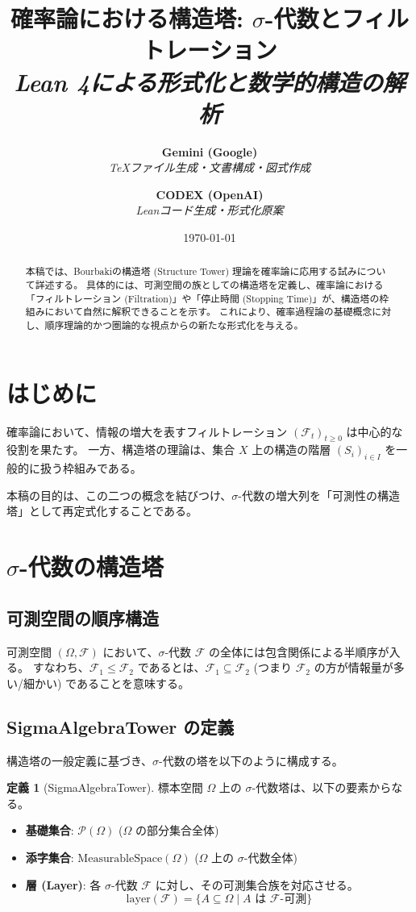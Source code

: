 \documentclass[a4paper,11pt]{article}
\title{確率論における構造塔: $\sigma$-代数とフィルトレーション\\
\large \textit{Lean 4による形式化と数学的構造の解析}}
\author{
  \textbf{Gemini (Google)} \\
  \small \textit{TeXファイル生成・文書構成・図式作成}
  \and
  \textbf{CODEX (OpenAI)} \\
  \small \textit{Leanコード生成・形式化原案}
}
\date{\today}
\theoremstyle{definition}
\newtheorem{definition}{定義}[section]
\theoremstyle{plain}
\begin{document}
\maketitle

\begin{abstract}
本稿では、Bourbakiの構造塔 (Structure Tower) 理論を確率論に応用する試みについて詳述する。
具体的には、可測空間の族としての構造塔を定義し、確率論における「フィルトレーション (Filtration)」や「停止時間 (Stopping Time)」が、構造塔の枠組みにおいて自然に解釈できることを示す。
これにより、確率過程論の基礎概念に対し、順序理論的かつ圏論的な視点からの新たな形式化を与える。
\end{abstract}

\tableofcontents

\section{はじめに}
確率論において、情報の増大を表すフィルトレーション $(\mathcal{F}_t)_{t \ge 0}$ は中心的な役割を果たす。
一方、構造塔の理論は、集合 $X$ 上の構造の階層 $(S_i)_{i \in I}$ を一般的に扱う枠組みである。

本稿の目的は、この二つの概念を結びつけ、$\sigma$-代数の増大列を「可測性の構造塔」として再定式化することである。

\section{$\sigma$-代数の構造塔}

\subsection{可測空間の順序構造}
可測空間 $(\Omega, \mathcal{F})$ において、$\sigma$-代数 $\mathcal{F}$ の全体には包含関係による半順序が入る。
すなわち、$\mathcal{F}_1 \le \mathcal{F}_2$ であるとは、$\mathcal{F}_1 \subseteq \mathcal{F}_2$ (つまり $\mathcal{F}_2$ の方が情報量が多い/細かい) であることを意味する。

\subsection{SigmaAlgebraTower の定義}
構造塔の一般定義に基づき、$\sigma$-代数の塔を以下のように構成する。

\begin{definition}[SigmaAlgebraTower]
標本空間 $\Omega$ 上の $\sigma$-代数塔は、以下の要素からなる。
\begin{itemize}
    \item \textbf{基礎集合}: $\mathcal{P}(\Omega)$ ($\Omega$ の部分集合全体)
    \item \textbf{添字集合}: $\mathrm{MeasurableSpace}(\Omega)$ ($\Omega$ 上の $\sigma$-代数全体)
    \item \textbf{層 (Layer)}: 各 $\sigma$-代数 $\mathcal{F}$ に対し、その可測集合族を対応させる。
    \[ \mathrm{layer}(\mathcal{F}) = \{ A \subseteq \Omega \mid A \text{ は } \mathcal{F}\text{-可測} \} \]
\end{itemize}
\end{definition}
\end{document}
